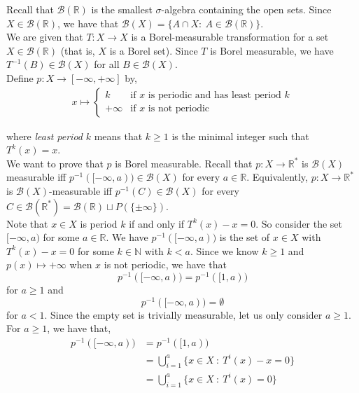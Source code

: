 \documentclass[12pt]{article}
\newenvironment{problem}[2][Problem]{\begin{trivlist}
\item[\hskip \labelsep {\bfseries #1}\hskip \labelsep {\bfseries #2.}]}{\end{trivlist}}
\begin{document}
\begin{problem}{4}
\end{problem}

Recall that $\mathcal{B}(\mathbb{R})$ is the smallest $\sigma$-algebra containing the open sets. Since $X \in \mathcal{B}(\mathbb{R})$, we have that $\mathcal{B}(X) = \{A \cap X: \ A \in \mathcal{B}(\mathbb{R})\}$.\\

We are given that $T: X \to X$ is a Borel-measurable transformation for a set $X \in \mathcal{B}(\mathbb{R})$ (that is, $X$ is a Borel set). Since $T$ is Borel measurable, we have $T^{-1}(B) \in \mathcal{B}(X)$ for all $B \in \mathcal{B}(X)$.\\

Define $p: X \to [- \infty, + \infty]$ by,
\begin{align*}
x \mapsto \begin{cases}
k & \text{if } x \text{ is periodic and has least period } k\\
+\infty & \text{if } x \text{ is not periodic}
\end{cases}
\end{align*}

where \textit{least period} $k$ means that $k \geq 1$ is the minimal integer such that $T^k(x) = x$.\\

We want to prove that $p$ is Borel measurable. Recall that $p: X \to \mathbb{R}^*$ is $\mathcal{B}(X)$ measurable iff $p^{-1}([-\infty, a)) \in \mathcal{B}(X)$ for every $a \in \mathbb{R}$. Equivalently, $p: X \to \mathbb{R}^*$ is $\mathcal{B}(X)$-measurable iff $p^{-1}(C) \in \mathcal{B}(X)$ for every $C \in \mathcal{B}(\mathbb{R}^*) = \mathcal{B}(\mathbb{R}) \sqcup P(\{\pm \infty\})$.\\

Note that $x \in X$ is period $k$ if and only if $T^k(x) - x = 0$. So consider the set $[-\infty, a)$ for some $a \in \mathbb{R}$. We have $p^{-1}([-\infty, a))$ is the set of $x \in X$ with $T^k(x) - x = 0$ for some $k \in \mathbb{N}$ with $k < a$. Since we know $k \geq 1$ and $p(x) \mapsto +\infty$ when $x$ is not periodic, we have that $$p^{-1}([-\infty, a)) = p^{-1}([1, a))$$ for $a \geq 1$ and $$p^{-1}([-\infty, a)) = \emptyset$$ for $a < 1$. Since the empty set is trivially measurable, let us only consider $a \geq 1$.\\

For $a \geq 1$, we have that,
\begin{align*}
p^{-1}([-\infty, a)) &= p^{-1}([1, a))\\
&= \bigcup_{i=1}^a \{x \in X \ : \ T^i(x) - x = 0\}\\
&= \bigcup_{i=1}^a \{x \in X \ : \ T^i(x) = 0\}
\end{align*}
\end{document}

